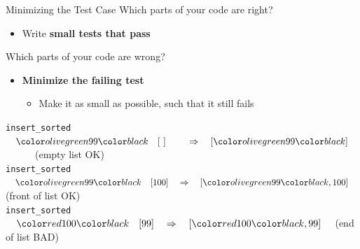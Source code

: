 \documentclass[xcolor=dvipsnames]{beamer}
\begin{document}
\begin{frame}{Minimizing the Test Case}
	Which parts of your code are right?
	\begin{itemize}
		\item Write {\bf small tests that pass}
	\end{itemize}
	\linegap

	Which parts of your code are wrong?
	\begin{itemize}
		\item {\bf Minimize the failing test}
		\begin{itemize}
			\item Make it as small as possible, such that it still fails
		\end{itemize}
	\end{itemize}
	\pause
	\linegap


	\texttt{insert\_sorted} $\quad \hilight{olivegreen}{99}  \quad [~]{\small~~~~} \quad \Rightarrow \quad [\hilight{olivegreen}{99}] \quad$ ~~~~~~(empty list OK) \\
	\texttt{insert\_sorted} $\quad \hilight{olivegreen}{99}  \quad [100] \quad \Rightarrow \quad [\hilight{olivegreen}{99},100] \quad$ (front of list OK) \\
	\pause
	\texttt{insert\_sorted} $\quad \hilight{red}{100}  \quad [99] \quad \Rightarrow \quad [\hilight{red}{100},99] \quad$ (end of list BAD)
\end{frame}
\end{document}
